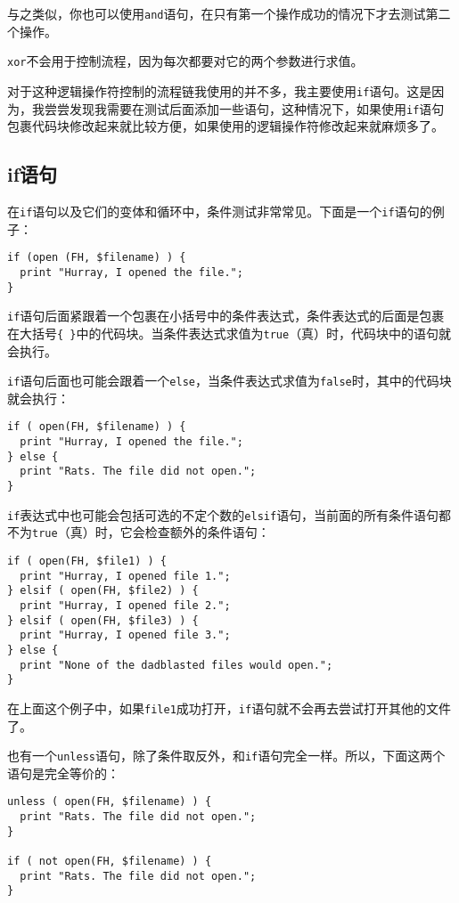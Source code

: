 与之类似，你也可以使用\verb|and|语句，在只有第一个操作成功的情况下才去测试第二个操作。

\verb|xor|不会用于控制流程，因为每次都要对它的两个参数进行求值。

对于这种逻辑操作符控制的流程链我使用的并不多，我主要使用\verb|if|语句。这是因为，我尝尝发现我需要在测试后面添加一些语句，这种情况下，如果使用\verb|if|语句包裹代码块修改起来就比较方便，如果使用的逻辑操作符修改起来就麻烦多了。

\subsection{if语句}
在\verb|if|语句以及它们的变体和循环中，条件测试非常常见。下面是一个\verb|if|语句的例子：

\begin{lstlisting}
if (open (FH, $filename) ) {
  print "Hurray, I opened the file.";
}
\end{lstlisting}

\verb|if|语句后面紧跟着一个包裹在小括号中的条件表达式，条件表达式的后面是包裹在大括号\verb|{ }|中的代码块。当条件表达式求值为\verb|true|（真）时，代码块中的语句就会执行。

\verb|if|语句后面也可能会跟着一个\verb|else|，当条件表达式求值为\verb|false|时，其中的代码块就会执行：

\begin{lstlisting}
if ( open(FH, $filename) ) {
  print "Hurray, I opened the file.";
} else {
  print "Rats. The file did not open.";
}
\end{lstlisting}

\verb|if|表达式中也可能会包括可选的不定个数的\verb|elsif|语句，当前面的所有条件语句都不为\verb|true|（真）时，它会检查额外的条件语句：

\begin{lstlisting}
if ( open(FH, $file1) ) {
  print "Hurray, I opened file 1.";
} elsif ( open(FH, $file2) ) {
  print "Hurray, I opened file 2.";
} elsif ( open(FH, $file3) ) {
  print "Hurray, I opened file 3.";
} else {
  print "None of the dadblasted files would open.";
}
\end{lstlisting}

在上面这个例子中，如果\verb|file1|成功打开，\verb|if|语句就不会再去尝试打开其他的文件了。

也有一个\verb|unless|语句，除了条件取反外，和\verb|if|语句完全一样。所以，下面这两个语句是完全等价的：

\begin{lstlisting}
unless ( open(FH, $filename) ) {
  print "Rats. The file did not open.";
}

if ( not open(FH, $filename) ) {
  print "Rats. The file did not open.";
}
\end{lstlisting}

